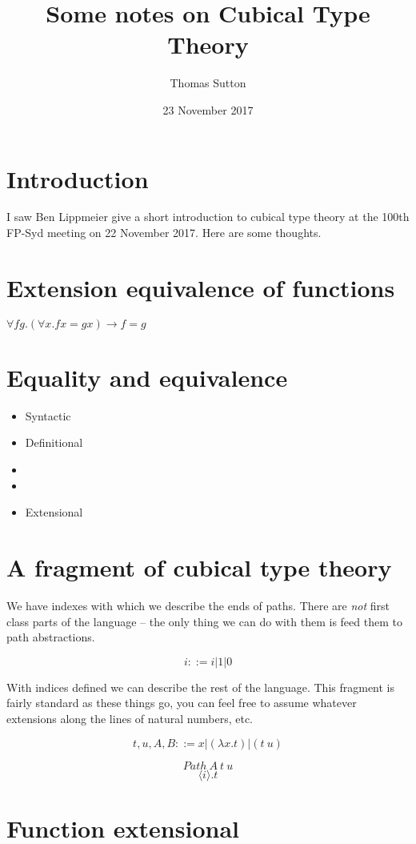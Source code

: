 \documentclass[a4paper]{article}
\title{Some notes on Cubical Type Theory}
\author{Thomas Sutton}
\date{23 November 2017}
\newcommand{\labs}[2]{(\lambda #1 . #2)}
\newcommand{\lapp}[2]{(#1 \: #2)}
\newcommand{\pabs}[2]{{\langle #1 \rangle}.{#2}}
\newcommand{\Path}[3]{{Path\:{#1}\:{#2}\:{#3}}}
\begin{document}
\maketitle

\section{Introduction}
I saw Ben Lippmeier give a short introduction to cubical type
theory\cite{DBLP:journals/corr/CohenCHM16} at the 100th FP-Syd meeting on 22 November
2017. Here are some thoughts.

\section{Extension equivalence of functions}

$\forall f g. (\forall x. f x = g x) \rightarrow f = g$

\section{Equality and equivalence}

\begin{itemize}
\item Syntactic
\item Definitional
\item
\item
\item Extensional
\end{itemize}

\section{A fragment of cubical type theory}

We have indexes with which we describe the ends of paths. There are
{\em not} first class parts of the language -- the only thing we can
do with them is feed them to path abstractions.

$$i ::= i | 1 | 0 $$

With indices defined we can describe the rest of the language. This
fragment is fairly standard as these things go, you can feel free to
assume whatever extensions along the lines of natural numbers, etc.

$$t,u,A,B ::= x | \labs{x}{t} | \lapp{t}{u} $$

$$\Path{A}{t}{u}$$
$$\pabs{i}{t}$$

\section{Function extensional}
\end{document}
